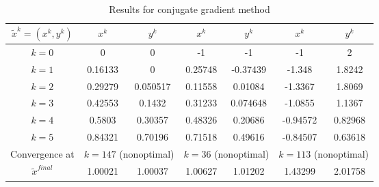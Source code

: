 \documentclass[11pt]{article}
\newcommand{\1}{\mathbbm{1}}
\begin{document}
\begin{table}[H]
	\small
	\centering
	\begin{tabular}{|c| c c| c c|c c| }
		\hline
		\hline                                                
		$\tilde{x}^k=(x^k,y^k)$  & $x^{k}$    & $y^k$      	 &	$x^{k}$    & $y^k$     		&  $x^{k}$     &$y^k$      \\ 
		\hline
	$k=0$	&	0		&	0		 &	-1		&		-1		& -1		 &	2      \\
$k=1$ &   0.16133  &         0  &  0.25748   &  -0.37439  &    -1.348   &  1.8242 \\
$k=2$ &   0.29279  &  0.050517  &  0.11558   &   0.01084  &   -1.3367   &  1.8069 \\
$k=3$ &   0.42553  &    0.1432  &  0.31233   &  0.074648  &   -1.0855   &  1.1367 \\
$k=4$ &    0.5803  &   0.30357  &  0.48326   &   0.20686  &  -0.94572   & 0.82968 \\
$k=5$ &    0.84321 &    0.70196 &   0.71518  &    0.49616 &   -0.84507  &  0.63618\\
		\hline
		Convergence at &	\multicolumn{2}{c}{$k=147$ (nonoptimal)}& \multicolumn{2}{|c|}{$k=36$ (nonoptimal)}&\multicolumn{2}{|c|}{$k=113$ (nonoptimal)}\\
		\hline
		$\tilde{x}^{final}$&	1.00021&1.00037&1.00627 & 1.01202 &  1.43299 & 2.01758\\
		\hline
		\hline
		\end{tabular} 
	\caption{Results for conjugate gradient method}
	\label{tab:2}
\end{table}
\end{document}
